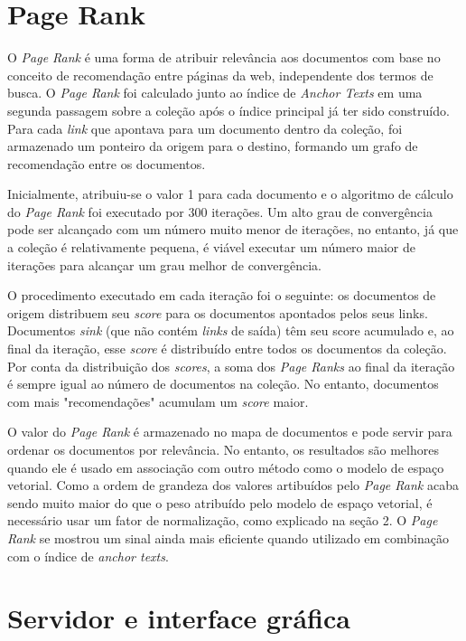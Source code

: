 \documentclass{article}
\begin{document}
\section{Page Rank}

O \textit{Page Rank} é uma forma de atribuir relevância aos documentos com base
no conceito de recomendação entre páginas da web, independente dos termos de busca. 
O \textit{Page Rank} foi calculado junto ao índice de \textit{Anchor Texts} 
em uma segunda passagem sobre a coleção após o índice principal já ter sido construído. Para cada \textit{link}
que apontava para um documento dentro da coleção, foi armazenado um ponteiro da origem para o destino,
formando um grafo de recomendação entre os documentos.

Inicialmente, atribuiu-se o valor 1 para cada documento e o algoritmo de cálculo do \textit{Page Rank} foi executado por 300 iterações.
Um alto grau de convergência pode ser alcançado com um número muito menor de iterações, no entanto, já que a coleção é relativamente
pequena, é viável executar um número maior de iterações para alcançar um grau melhor de convergência.

O procedimento executado em cada iteração foi o seguinte: os documentos de origem distribuem seu \textit{score} para os documentos apontados 
pelos seus links. Documentos \textit{sink} (que não contém \textit{links} de saída) têm seu score acumulado e, ao final da iteração,
esse \textit{score} é distribuído entre todos os documentos da coleção. Por conta da distribuição dos \textit{scores}, 
a soma dos \textit{Page Ranks} ao final da iteração é sempre igual ao número de documentos na coleção. No entanto, documentos com
mais "recomendações" acumulam um \textit{score} maior. 

O valor do \textit{Page Rank} é armazenado no mapa de documentos e pode servir para ordenar os documentos por
relevância. No entanto, os resultados são melhores quando ele é usado em associação com outro método como o modelo
de espaço vetorial. Como a ordem de grandeza dos valores artibuídos pelo \textit{Page Rank} acaba sendo muito maior
do que o peso atribuído pelo modelo de espaço vetorial, é necessário usar um fator de normalização, como explicado
na seção 2. O \textit{Page Rank} se mostrou um sinal ainda mais eficiente quando utilizado
em combinação com o índice de \textit{anchor texts}.

\section{Servidor e interface gráfica}
\end{document}

